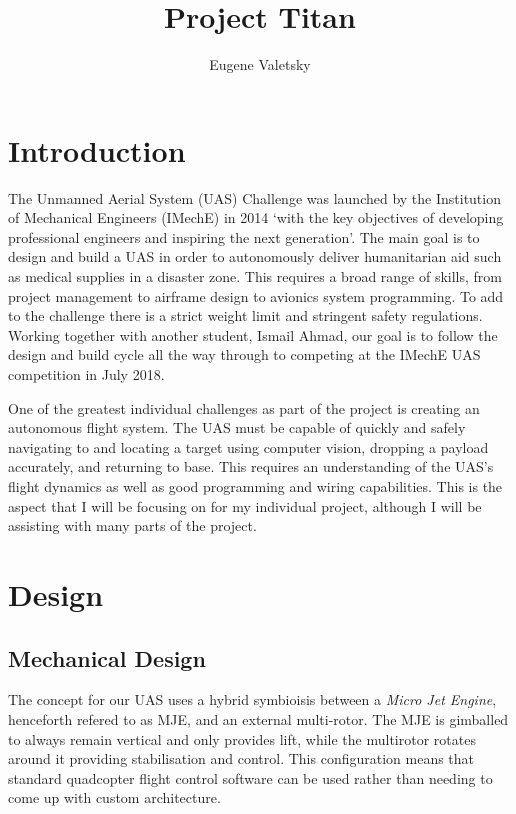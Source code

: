 \documentclass[11pt]{article}
\author{Eugene Valetsky}
\title{Project Titan} %
\begin{document}
\maketitle
\tableofcontents

\section{Introduction}
The Unmanned Aerial System (UAS) Challenge was launched by the Institution of Mechanical Engineers (IMechE) in 2014 `with the key objectives of developing professional engineers and inspiring the next generation'\cite{IMechE_about_uas}. The main goal is to design and build a UAS in order to autonomously deliver humanitarian aid such as medical supplies in a disaster zone. This requires a broad range of skills, from project management to airframe design to avionics system programming. To add to the challenge there is a strict weight limit and stringent safety regulations. Working together with another student, Ismail Ahmad, our goal is to follow the design and build cycle all the way through to competing at the IMechE UAS competition in July 2018.

One of the greatest individual challenges as part of the project is creating an autonomous flight system. The UAS must be capable of quickly and safely navigating to and locating a target using computer vision, dropping a payload accurately, and returning to base. This requires an understanding of the UAS’s flight dynamics as well as good programming and wiring capabilities. This is the aspect that I will be focusing on for my individual project, although I will be assisting with many parts of the project.

\section{Design}
\subsection{Mechanical Design}
The concept for our UAS uses a hybrid symbioisis between a \emph{Micro Jet Engine}, henceforth refered to as MJE, and an external multi-rotor. The MJE is gimballed to always remain vertical and only provides lift, while the multirotor rotates around it providing stabilisation and control. This configuration means that standard quadcopter flight control software can be used rather than needing to come up with custom architecture.
\end{document}
